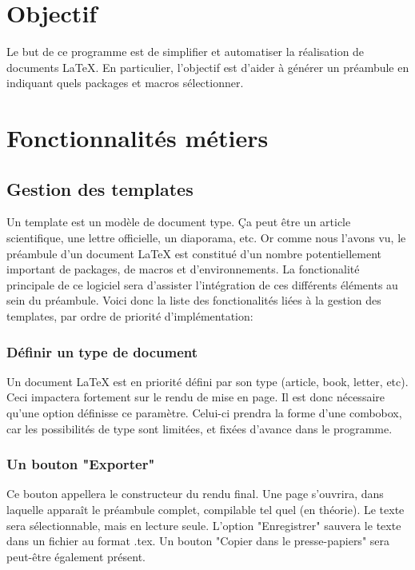\documentclass[a4paper, oneside]{article}
\begin{document}
\section{Objectif}
\label{sec:org02e548f}

Le but de ce programme est de simplifier et automatiser la réalisation
de documents \LaTeX{}. En particulier, l'objectif est d'aider à
générer un préambule en indiquant quels packages et macros
sélectionner.

\section{Fonctionnalités métiers}
\label{sec:org2580d19}
\subsection{Gestion des  templates}
\label{sec:org1bfcbeb}
Un template est un modèle de document type. Ça peut être un article
scientifique, une lettre officielle, un diaporama, etc. Or comme nous l'avons
vu, le préambule d'un document \LaTeX{} est constitué d'un nombre
potentiellement important de packages, de macros et d'environnements. La
fonctionalité principale de ce logiciel sera d'assister l'intégration de ces
différents éléments au sein du préambule. Voici donc la liste des fonctionalités
liées à la gestion des templates, par ordre de priorité d'implémentation:

\subsubsection{Définir un type de document}
\label{sec:orga2f4dc3}
Un document \LaTeX{} est en priorité défini par son type (article, book, letter,
etc). Ceci impactera fortement sur le rendu de mise en page. Il est donc
nécessaire qu'une option définisse ce paramètre. Celui-ci prendra la forme d'une
combobox, car les possibilités de type sont limitées, et fixées d'avance
dans le programme.
\subsubsection{Un bouton "Exporter"}
\label{sec:orgb098c92}
Ce bouton appellera le constructeur du rendu final. Une page
s'ouvrira, dans laquelle apparaît le préambule complet, compilable
tel quel (en théorie). Le texte sera sélectionnable, mais en lecture
seule. L'option "Enregistrer" sauvera le texte dans un fichier au
format .tex. Un bouton "Copier dans le presse-papiers" sera peut-être
également présent.
\end{document}
